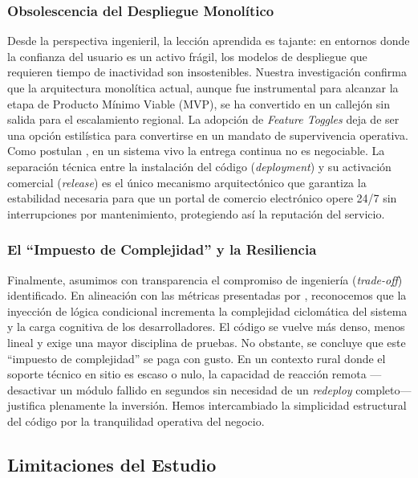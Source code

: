 \subsubsection{Obsolescencia del Despliegue Monolítico}
Desde la perspectiva ingenieril, la lección aprendida es tajante: en entornos donde la confianza del usuario es un activo frágil, los modelos de despliegue que requieren tiempo de inactividad son insostenibles. Nuestra investigación confirma que la arquitectura monolítica actual, aunque fue instrumental para alcanzar la etapa de Producto Mínimo Viable (MVP), se ha convertido en un callejón sin salida para el escalamiento regional. La adopción de \textit{Feature Toggles} deja de ser una opción estilística para convertirse en un mandato de supervivencia operativa. Como postulan \cite{meyer2016continuous}, en un sistema vivo la entrega continua no es negociable. La separación técnica entre la instalación del código (\textit{deployment}) y su activación comercial (\textit{release}) es el único mecanismo arquitectónico que garantiza la estabilidad necesaria para que un portal de comercio electrónico opere 24/7 sin interrupciones por mantenimiento, protegiendo así la reputación del servicio.

\subsubsection{El ``Impuesto de Complejidad'' y la Resiliencia}
Finalmente, asumimos con transparencia el compromiso de ingeniería (\textit{trade-off}) identificado. En alineación con las métricas presentadas por \cite{sharma2024complexity}, reconocemos que la inyección de lógica condicional incrementa la complejidad ciclomática del sistema y la carga cognitiva de los desarrolladores. El código se vuelve más denso, menos lineal y exige una mayor disciplina de pruebas. No obstante, se concluye que este ``impuesto de complejidad'' se paga con gusto. En un contexto rural donde el soporte técnico en sitio es escaso o nulo, la capacidad de reacción remota —desactivar un módulo fallido en segundos sin necesidad de un \textit{redeploy} completo— justifica plenamente la inversión. Hemos intercambiado la simplicidad estructural del código por la tranquilidad operativa del negocio.

\subsection{Limitaciones del Estudio}

